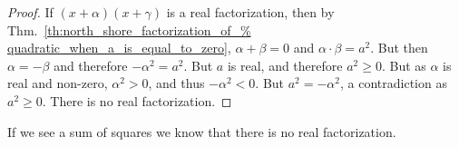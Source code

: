 \documentclass[crop=false,class=book,oneside]{standalone}                      %
\begin{document}
        \begin{proof}
            If $(x+\alpha)(x+\gamma)$ is a real factorization,
            then by Thm.~\ref{th:north_shore_factorization_of_%
                              quadratic_when_a_is_equal_to_zero},
            $\alpha+\beta=0$ and $\alpha\cdot\beta=a^{2}$. But then
            $\alpha=-\beta$ and therefore $-\alpha^{2}=a^{2}$. But
            $a$ is real, and therefore $a^{2}\geq 0$. But as
            $\alpha$ is real and non-zero, $\alpha^{2}>0$, and
            thus $-\alpha^{2}<0$. But $a^{2}=-\alpha^{2}$,
            a contradiction as $a^{2}\geq 0$. There is no real factorization.
        \end{proof}
        \begin{remark}
        If we see a sum of squares we know that there is no real factorization.
        \end{remark}
\end{document}
